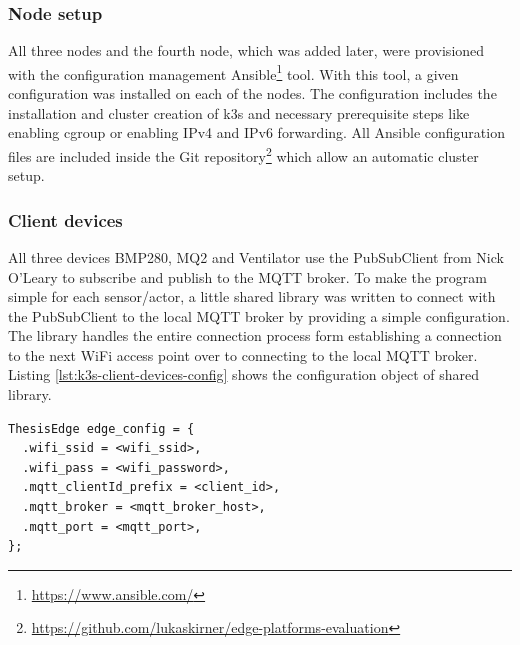 \subsubsection*{Node setup}
All three nodes and the fourth node, which was added later, were provisioned with the configuration management Ansible\footnote{\url{https://www.ansible.com/}} tool. With this tool, a given configuration was installed on each of the nodes. The configuration includes the installation and cluster creation of k3s and necessary prerequisite steps like enabling cgroup or enabling IPv4 and IPv6 forwarding. All Ansible configuration files are included inside the Git repository\footnote{\url{https://github.com/lukaskirner/edge-platforms-evaluation}} which allow an automatic cluster setup.

\subsubsection*{Client devices}\label{subsubsec:k3s-client-devices}
All three devices BMP280, MQ2 and Ventilator use the PubSubClient from Nick O'Leary to subscribe and publish to the MQTT broker. To make the program simple for each sensor/actor, a little shared library was written to connect with the PubSubClient to the local MQTT broker by providing a simple configuration. The library handles the entire connection process form establishing a connection to the next WiFi access point over to connecting to the local MQTT broker. Listing \ref{lst:k3s-client-devices-config} shows the configuration object of shared library.

\begin{lstlisting}[caption={ThesisEdge library configuration object.},label={lst:k3s-client-devices-config},captionpos=b]
ThesisEdge edge_config = {
  .wifi_ssid = <wifi_ssid>,
  .wifi_pass = <wifi_password>,
  .mqtt_clientId_prefix = <client_id>,
  .mqtt_broker = <mqtt_broker_host>,
  .mqtt_port = <mqtt_port>,
};
\end{lstlisting}


